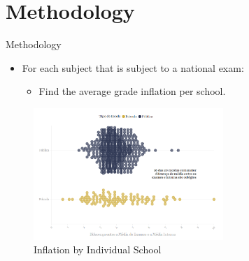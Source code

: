 \documentclass{beamer}
\begin{document}
\section{Methodology}

\begin{frame}{Methodology}
  \begin{itemize}
    \item For each subject that is subject to a national exam:
    \begin{itemize}
        \item Find the average grade inflation per school.
    \end{itemize}
  \end{itemize}
  \begin{figure}[ht]
  \centering
  \includegraphics[height=5cm, keepaspectratio]{Figures/InflationBySchool.png}
  \caption{Inflation by Individual School}
  \label{fig: InflationBySchool}
\end{figure}
\end{frame}
\end{document}
